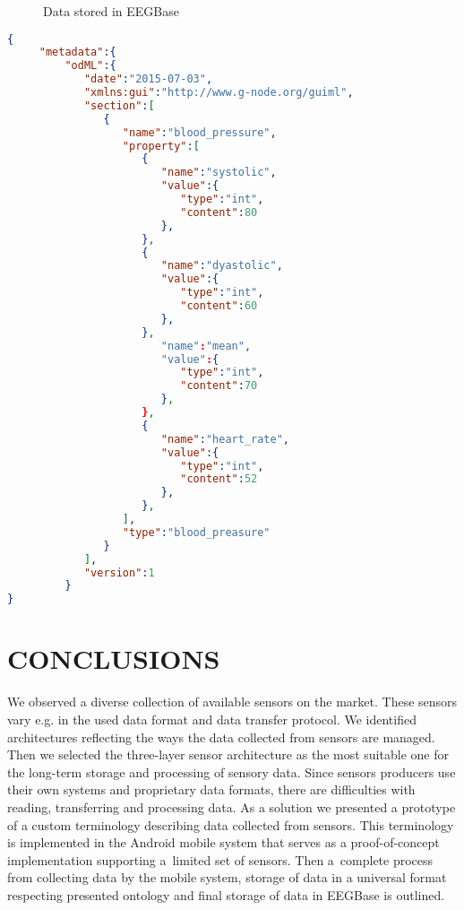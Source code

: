\documentclass[a4paper,twoside]{article}
\begin{document}
\begin{figure}

  \centering
   {}
  \caption{Data stored in EEGBase}
  \label{fig:EEGBase}
 \end{figure}


\begin{lstlisting}[language=json,caption=blood pressure example, label=odml_example]
{
     "metadata":{
         "odML":{
            "date":"2015-07-03",
            "xmlns:gui":"http://www.g-node.org/guiml",
            "section":[
               {
                  "name":"blood_pressure",
                  "property":[
                     {
                        "name":"systolic",
                        "value":{
                           "type":"int",
                           "content":80
                        },
                     },
                     {
                        "name":"dyastolic",
                        "value":{
                           "type":"int",
                           "content":60
                        },
                     },
                        "name":"mean",
                        "value":{
                           "type":"int",
                           "content":70
                        },
                     },
                     {
                        "name":"heart_rate",
                        "value":{
                           "type":"int",
                           "content":52
                        },
                     },
                  ],
                  "type":"blood_preasure"
               }
            ],
            "version":1
         }
}
\end{lstlisting}





\section{\uppercase{Conclusions}}
\label{sec:conclusion}

\noindent
We observed a diverse collection of available sensors on the market. These sensors vary e.g. in the used data format and data transfer protocol. We identified architectures reflecting the ways the data collected from sensors are managed. Then we selected the three-layer sensor architecture as the most suitable one for the long-term storage and processing of sensory data. Since sensors producers use their own systems and proprietary data formats, there are difficulties with reading, transferring and processing data. As a solution we presented a prototype of a custom terminology describing data collected from sensors. This terminology is implemented in the Android mobile system that serves as a proof-of-concept implementation supporting a~limited set of sensors. Then a~complete process from collecting data by the mobile system, storage of data in a universal format respecting presented ontology and final storage of data in EEGBase is outlined.
 
\end{document}
